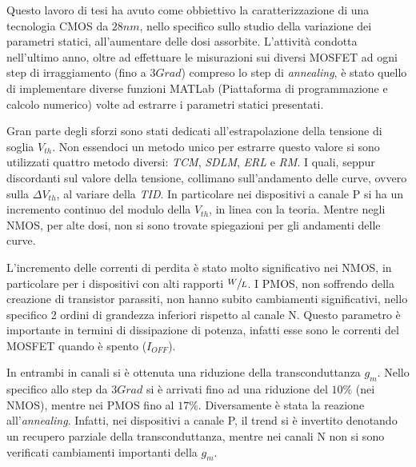 Questo lavoro di tesi ha avuto come obbiettivo la caratterizzazione di una tecnologia CMOS da $28nm$, nello specifico sullo studio della variazione dei parametri statici, all'aumentare delle dosi assorbite.
L'attività condotta nell'ultimo anno, oltre ad effettuare le misurazioni sui diversi MOSFET ad ogni step di irraggiamento (fino a $3Grad$) compreso lo step di \textit{annealing}, è stato quello di implementare diverse funzioni MATLab (Piattaforma di programmazione e calcolo numerico) volte ad estrarre i parametri statici presentati.

\vspace{0.5cm}

Gran parte degli sforzi sono stati dedicati all'estrapolazione della tensione di soglia $V_{th}$. Non essendoci un metodo unico per estrarre questo valore si sono utilizzati quattro metodo diversi: \textit{TCM}, \textit{SDLM}, \textit{ERL} e \textit{RM}. I quali, seppur discordanti sul valore della tensione, collimano sull'andamento delle curve, ovvero sulla $\Delta V_{th}$, al variare della \textit{TID}. In particolare nei dispositivi a canale P si ha un incremento continuo del modulo della $V_{th}$, in linea con la teoria. Mentre negli NMOS, per alte dosi, non si sono trovate spiegazioni per gli andamenti delle curve.

L'incremento delle correnti di perdita è stato molto significativo nei NMOS, in particolare per i dispositivi con  alti rapporti $\sfrac{W}{L}$. I PMOS, non soffrendo della creazione di transistor parassiti, non hanno subito cambiamenti significativi, nello specifico 2 ordini di grandezza inferiori rispetto al canale N. Questo parametro è importante in termini di dissipazione di potenza, infatti esse sono le correnti del MOSFET quando è spento ($I_{OFF}$).   

In entrambi in canali si è ottenuta una riduzione della transconduttanza $g_m$. Nello specifico allo step da $3Grad$ si è arrivati fino ad una riduzione del $10\%$ (nei NMOS), mentre nei PMOS fino al $17\%$. Diversamente è stata la reazione all'\textit{annealing}. Infatti, nei dispositivi a canale P, il trend si è invertito denotando un recupero parziale della transconduttanza, mentre nei canali N non si sono verificati cambiamenti importanti della $g_m$.    





